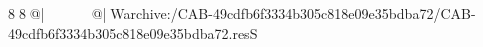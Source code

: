 8  8  @|                                                  @| W   archive:/CAB-49cdfb6f3334b305c818e09e35bdba72/CAB-49cdfb6f3334b305c818e09e35bdba72.resS 